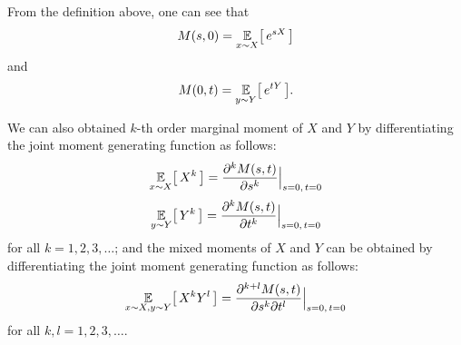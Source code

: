 From the definition above, one can see that 
\begin{equation}
    M(s, 0) = \uexp[x \sim X]{e^{sX}}
\end{equation}
and 
\begin{equation}
    M(0, t) = \uexp[y \sim Y]{e^{tY}}.
\end{equation}

We can also obtained $k$-th order marginal moment of $X$ and $Y$ by differentiating the joint moment generating function as follows:
\begin{equation}
    \uexp[x \sim X]{X^k} = \frac{\partial^k M(s,t)}{\partial s^k} \Big|_{s=0,\, t=0}
\end{equation}
\begin{equation}
    \uexp[y \sim Y]{Y^k} = \frac{\partial^k M(s,t)}{\partial t^k} \Big|_{s=0,\, t=0}
\end{equation}
for all $k = 1, 2, 3, \ldots$; and the mixed moments of $X$ and $Y$ can be obtained by differentiating the joint moment generating function as follows:
\begin{equation}
    \uexp[x \sim X, y \sim Y]{X^k Y^l} = \frac{\partial^{k+l} M(s,t)}{\partial s^k \partial t^l} \Big|_{s=0,\, t=0}
\end{equation}
for all $k, l = 1, 2, 3, \ldots$.

